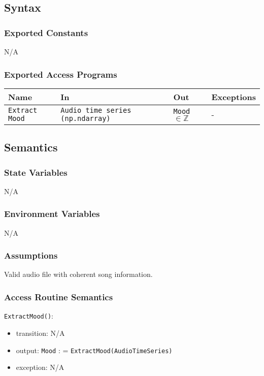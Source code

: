 \documentclass[12pt, titlepage]{article}
\begin{document}
\subsection{Syntax}

\subsubsection{Exported Constants}
N/A

\subsubsection{Exported Access Programs}

\begin{center}
\begin{tabular}{p{2cm} p{4cm} p{4cm} p{2cm}}
\hline
\textbf{Name} & \textbf{In} & \textbf{Out} & \textbf{Exceptions}\\
\hline%
\texttt{Extract Mood} &\texttt{Audio time series (np.ndarray)} &\texttt{Mood} $\in{\mathbb{Z}}$ &-\\
\hline
\end{tabular}
\end{center}

\subsection{Semantics}

\subsubsection{State Variables}
N/A

\subsubsection{Environment Variables}
N/A

\subsubsection{Assumptions}
Valid audio file with coherent song information.

\subsubsection{Access Routine Semantics}

\noindent \texttt{ExtractMood()}:
\begin{itemize}
\item transition: N/A 
\item output: \texttt{Mood} : = \texttt{ExtractMood(Audio\textunderscore Time\textunderscore Series)}
\item exception: N/A
\end{itemize}
\end{document}
